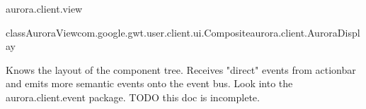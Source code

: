 \begin{texdocpackage}{aurora.client.view}
\label{texdoclet:aurora.client.view}

\begin{texdocclass}{class}{AuroraView}{com.google.gwt.user.client.ui.Composite}{aurora.client.AuroraDisplay}
\label{texdoclet:aurora.client.view.AuroraView}
\begin{texdocclassintro}
Knows the layout of the component tree.
 Receives "direct" events from actionbar and emits more semantic events onto the event bus.
 Look into the aurora.client.event package.
 TODO this doc is incomplete.\end{texdocclassintro}
\begin{texdocclassconstructors}
\end{texdocclassconstructors}
\begin{texdocclassmethods}
\end{texdocclassmethods}
\end{texdocclass}


\end{texdocpackage}



